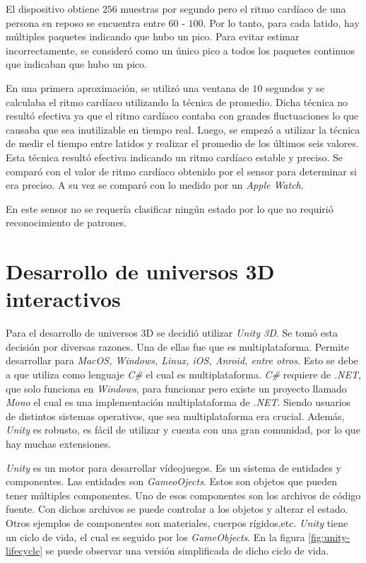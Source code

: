 El dispositivo obtiene $256$ muestras por segundo pero el ritmo cardíaco de una persona en reposo se encuentra entre $ 60$ - $100$. Por lo tanto, para cada latido, hay múltiples paquetes indicando que hubo un pico. Para evitar estimar incorrectamente, se consideró como un único pico a todos los paquetes continuos que indicaban que hubo un pico.

En una primera aproximación, se utilizó una ventana de $10$ segundos y se calculaba el ritmo cardíaco utilizando la técnica de promedio. Dicha técnica no resultó efectiva ya que el ritmo cardíaco contaba con grandes fluctuaciones lo que causaba que sea inutilizable en tiempo real. Luego, se empezó a utilizar la técnica de medir el tiempo entre latidos y realizar el promedio de los últimos seis valores. Esta técnica resultó efectiva indicando un ritmo cardíaco estable y preciso. Se comparó con el valor de ritmo cardíaco obtenido por el sensor para determinar si era preciso. A su vez se comparó con lo medido por un \emph{Apple Watch}.

En este sensor no se requería clasificar ningún estado por lo que no requirió reconocimiento de patrones.

\section{Desarrollo de universos 3D interactivos}

Para el desarrollo de universos 3D se decidió utilizar \emph{Unity 3D}. Se tomó esta decisión por diversas razones. Una de ellas fue que es multiplataforma. Permite desarrollar para \emph{MacOS, Windows, Linux, iOS, Anroid, entre otros.} Esto se debe a que utiliza como lenguaje \emph{C\#} el cual es multiplataforma. \emph{C\#} requiere de \emph{.NET}, que solo funciona en \emph{Windows}, para funcionar pero existe un proyecto llamado \emph{Mono} el cual es una implementación multiplataforma de \emph{.NET}.  Siendo usuarios de distintos sistemas operativos, que sea multiplataforma era crucial. Además, \emph{Unity} es robusto, es fácil de utilizar y cuenta con una gran comunidad, por lo que hay muchas extensiones.

\emph{Unity} es un motor para desarrollar vídeojuegos. Es un sistema de entidades y componentes. Las entidades son \emph{GameoOjects}. Estos son objetos que pueden tener múltiples componentes. Uno de esos componentes son los archivos de código fuente. Con dichos archivos se puede controlar a los objetos y alterar el estado. Otros ejemplos de componentes son materiales, cuerpos rígidos,etc. \emph{Unity} tiene un ciclo de vida, el cual es seguido por los \emph{GameObjects}. En la figura \ref{fig:unity-lifecycle} se puede observar una versión simplificada de dicho ciclo de vida.

